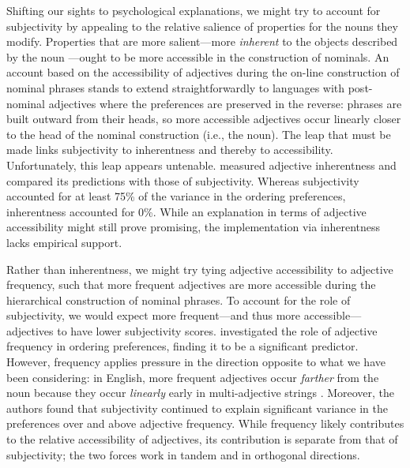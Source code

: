 \documentclass{sp}
\newcommand{\jd}[1]{\textcolor{Blue}{[jd: #1]}}
\begin{document}
Shifting our sights to psychological explanations, we might try to account for subjectivity by appealing to the relative salience of properties for the nouns they modify. Properties that are more salient---more \emph{inherent} to the objects described by the noun \citep[e.g.,][]{whorf1945}---ought to be more accessible in the construction of nominals. An account based on the accessibility of adjectives during the on-line construction of nominal phrases stands to extend straightforwardly to languages with post-nominal adjectives where the preferences are preserved in the reverse: phrases are built outward from their heads, so more accessible adjectives occur linearly closer to the head of the nominal construction (i.e., the noun). The leap that must be made links subjectivity to inherentness and thereby to accessibility. Unfortunately, this leap appears untenable. \citeauthor{scontrasetal2017adjectives} measured adjective inherentness and compared its predictions with those of subjectivity. Whereas subjectivity accounted for at least 75\% of the variance in the ordering preferences, inherentness accounted for 0\%. While an explanation in terms of adjective accessibility might still prove promising, the implementation via inherentness lacks empirical support.

Rather than inherentness, we might try tying adjective accessibility to adjective frequency, such that more frequent adjectives are more accessible during the hierarchical construction of nominal phrases. To account for the role of subjectivity, we would expect more frequent---and thus more accessible---adjectives to have lower subjectivity scores. \citeauthor{scontrasetal2017adjectives} investigated the role of adjective frequency in ordering preferences, finding it to be a significant predictor. However, frequency applies pressure in the direction opposite to what we have been considering: in English, more frequent adjectives occur \emph{farther} from the noun because they occur \emph{linearly} early in multi-adjective strings \citep[cf.][]{wulff2003}. 
Moreover, the authors found that subjectivity continued to explain significant variance in the preferences over and above adjective frequency. While frequency likely contributes to the relative accessibility of adjectives, its contribution is separate from that of subjectivity; the two forces work in tandem and in orthogonal directions. %
\end{document}
